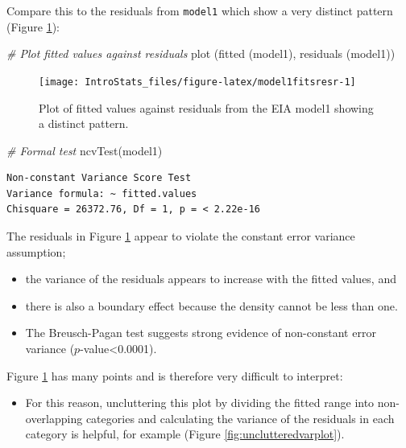 \documentclass[
  oneside]{krantz}
\newenvironment{Shaded}{\begin{snugshade}}{\end{snugshade}}
\newcommand{\CommentTok}[1]{\textcolor[rgb]{0.56,0.35,0.01}{\textit{#1}}}
\newcommand{\FunctionTok}[1]{\textcolor[rgb]{0.00,0.00,0.00}{#1}}
\newcommand{\NormalTok}[1]{#1}
\providecommand{\tightlist}{%
  \setlength{\itemsep}{0pt}\setlength{\parskip}{0pt}}
\begin{document}
Compare this to the residuals from \texttt{model1} which show a very distinct pattern (Figure \ref{fig:model1fitsresr}):

\begin{Shaded}
\begin{Highlighting}[]
\CommentTok{\# Plot fitted values against residuals}
\FunctionTok{plot}\NormalTok{ (}\FunctionTok{fitted}\NormalTok{ (model1), }\FunctionTok{residuals}\NormalTok{ (model1))}
\end{Highlighting}
\end{Shaded}

\begin{figure}

{\centering \texttt{[image: IntroStats\_files/figure-latex/model1fitsresr-1]} 

}

\caption{Plot of fitted values against residuals from the EIA model1 showing a distinct pattern.}\label{fig:model1fitsresr}
\end{figure}

\begin{Shaded}
\begin{Highlighting}[]
\CommentTok{\# Formal test}
\FunctionTok{ncvTest}\NormalTok{(model1)}
\end{Highlighting}
\end{Shaded}

\begin{verbatim}
Non-constant Variance Score Test 
Variance formula: ~ fitted.values 
Chisquare = 26372.76, Df = 1, p = < 2.22e-16
\end{verbatim}

The residuals in Figure \ref{fig:model1fitsresr} appear to violate the constant error variance assumption;

\begin{itemize}
\tightlist
\item
  the variance of the residuals appears to increase with the fitted values, and
\item
  there is also a boundary effect because the density cannot be less than one.
\item
  The Breusch-Pagan test suggests strong evidence of non-constant error variance (\(p\)-value\textless0.0001).
\end{itemize}

Figure \ref{fig:model1fitsresr} has many points and is therefore very difficult to interpret:

\begin{itemize}
\tightlist
\item
  For this reason, uncluttering this plot by dividing the fitted range into non-overlapping categories and calculating the variance of the residuals in each category is helpful, for example (Figure \ref{fig:unclutteredvarplot}).
\end{itemize}
\end{document}
